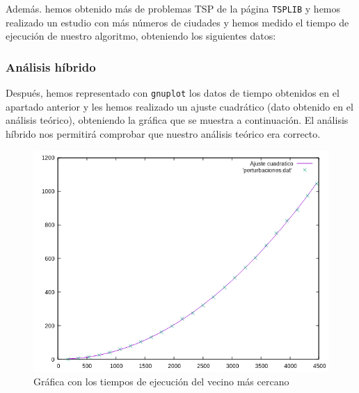\documentclass[10pt,a4paper]{article}
\begin{document}
Además. hemos obtenido más de problemas TSP de la página \texttt{TSPLIB} y hemos realizado un estudio con más números de ciudades y hemos medido el tiempo de ejecución de nuestro algoritmo, obteniendo los siguientes datos:

 \begin{table}[h!]
 	\centering
 	\footnotesize
 	\caption{Experiencia empírica de perturbaciones}
 \end{table}
 
 \subsubsection*{Análisis híbrido}
 
Después, hemos representado con \texttt{gnuplot} los datos de tiempo obtenidos en el apartado anterior y les hemos realizado un ajuste cuadrático (dato obtenido en el análisis teórico), obteniendo la gráfica que se muestra a continuación. El análisis híbrido nos permitirá comprobar que nuestro análisis teórico era correcto.

\begin{figure}[h!]
 	\centering
 	\includegraphics[scale=0.55]{./Images/perturbaciones.png}
 	\caption{Gráfica con los tiempos de ejecución del vecino más cercano}
 \end{figure}
 
\end{document}
